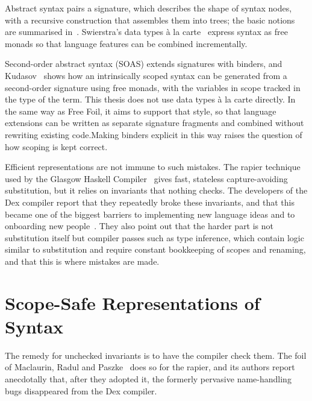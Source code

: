 Abstract syntax pairs a signature, which describes the shape of syntax nodes, with a recursive construction that assembles them into trees; the basic notions are summarised in~\cite[Sec.~2.3]{tomilovskaia2025bidir}. Swierstra's data types \`a la carte~\cite{swierstra2008datatypes} express syntax as free monads so that language features can be combined incrementally.

Second-order abstract syntax (SOAS) extends signatures with binders, and Kudasov~\cite{kudasov2024freemonads} shows how an intrinsically scoped syntax can be generated from a second-order signature using free monads, with the variables in scope tracked in the type of the term. This thesis does not use data types \`a la carte directly. In the same way as Free Foil, it aims to support that style, so that language extensions can be written as separate signature fragments and combined without rewriting existing code.Making binders explicit in this way raises the question of how scoping is kept correct.

Efficient representations are not immune to such mistakes. The rapier technique used by the Glasgow Haskell Compiler~\cite{peytonjones2002secrets} gives fast, stateless capture-avoiding substitution, but it relies on invariants that nothing checks. The developers of the Dex compiler report that they repeatedly broke these invariants, and that this became one of the biggest barriers to implementing new language ideas and to onboarding new people~\cite{maclaurin2023foil}. They also point out that the harder part is not substitution itself but compiler passes such as type inference, which contain logic similar to substitution and require constant bookkeeping of scopes and renaming, and that this is where mistakes are made.

\section{Scope-Safe Representations of Syntax}
\label{sec:lr-scope}

The remedy for unchecked invariants is to have the compiler check them. The foil of Maclaurin, Radul and Paszke~\cite{maclaurin2023foil} does so for the rapier, and its authors report anecdotally that, after they adopted it, the formerly pervasive name-handling bugs disappeared from the Dex compiler.

